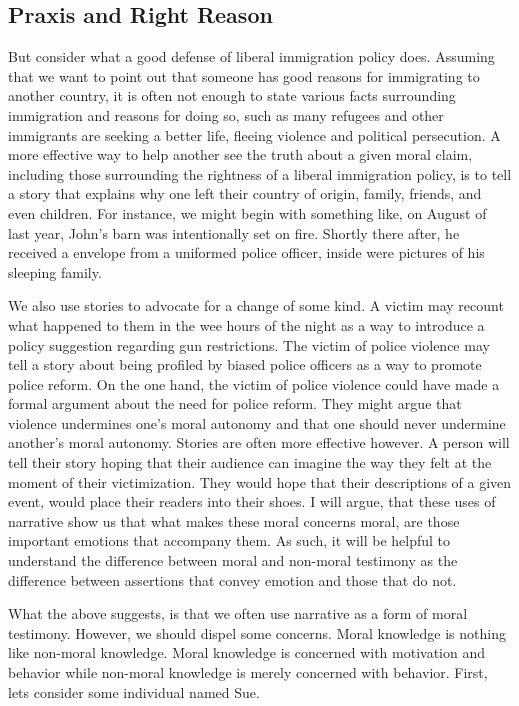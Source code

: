 \documentclass[
  12pt,
]{book}
\theoremstyle{definition}
\theoremstyle{definition}
\theoremstyle{definition}
\theoremstyle{definition}
\theoremstyle{remark}
\begin{document}
\subsection*{Praxis and Right Reason}\label{praxis-and-right-reason}

But consider what a good defense of liberal immigration policy does. Assuming that we want to point out that someone has good reasons for immigrating to another country, it is often not enough to state various facts surrounding immigration and reasons for doing so, such as many refugees and other immigrants are seeking a better life, fleeing violence and political persecution. A more effective way to help another see the truth about a given moral claim, including those surrounding the rightness of a liberal immigration policy, is to tell a story that explains why one left their country of origin, family, friends, and even children. For instance, we might begin with something like, on August of last year, John's barn was intentionally set on fire. Shortly there after, he received a envelope from a uniformed police officer, inside were pictures of his sleeping family.

We also use stories to advocate for a change of some kind. A victim may recount what happened to them in the wee hours of the night as a way to introduce a policy suggestion regarding gun restrictions. The victim of police violence may tell a story about being profiled by biased police officers as a way to promote police reform. On the one hand, the victim of police violence could have made a formal argument about the need for police reform. They might argue that violence undermines one's moral autonomy and that one should never undermine another's moral autonomy. Stories are often more effective however. A person will tell their story hoping that their audience can imagine the way they felt at the moment of their victimization. They would hope that their descriptions of a given event, would place their readers into their shoes. I will argue, that these uses of narrative show us that what makes these moral concerns moral, are those important emotions that accompany them. As such, it will be helpful to understand the difference between moral and non-moral testimony as the difference between assertions that convey emotion and those that do not.

What the above suggests, is that we often use narrative as a form of moral testimony. However, we should dispel some concerns. Moral knowledge is nothing like non-moral knowledge. Moral knowledge is concerned with motivation and behavior while non-moral knowledge is merely concerned with behavior. First, lets consider some individual named Sue.
\end{document}
